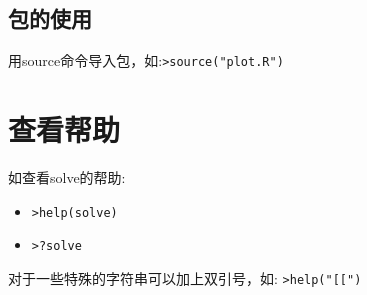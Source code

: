 \documentclass[a4paper,12pt]{ctexart}
\begin{document}
\subsection{包的使用}
用source命令导入包，如:\verb|>source("plot.R")|

\section{查看帮助}
如查看solve的帮助:
\begin{itemize}
  \item \verb|>help(solve)|
  \item \verb|>?solve|
\end{itemize}
对于一些特殊的字符串可以加上双引号，如: \verb|>help("[[")|


\end{document}
